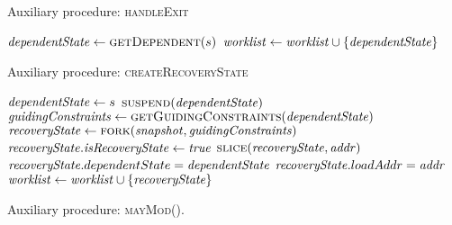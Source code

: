 \begin{algorithm}
  \caption{Auxiliary procedure: \textsc{handleExit}
  \label{fig:aux-func-recS}}
\begin{algorithmic}[1]

 \label{alg:exit-check-recovery}
  \State {} \label{alg:exit-terminate-recovery}
  \State $\dependentState \gets  \Call{getDependent}{\workstate}$ \label{alg:exit-extract-dependent}
  \State {} \label{alg:exit-resume}
  \State $\mathit{worklist} \gets  \mathit{worklist} \cup \{\mathit{dependentState}\}$
\Else
  \State {}  \label{alg:exit-normal}
  \label{alg:push-worklist-exit}
\EndIf
\EndFunction
\end{algorithmic}
\end{algorithm}

\begin{algorithm}
  \caption{Auxiliary procedure: \textsc{createRecoveryState}
  \label{fig:aux-func-recS}}
\begin{algorithmic}[1]

   \label{alg:recover-foreach}
     \label{alg:recover-if-found}
       \State $\mathit{dependentState} \gets s$ \label{alg:recover-gen-depS}
       \State $\Call{suspend}{\dependentState}$ \label{alg:recover-suspend}
       \State $\gc \gets  \Call{getGuidingConstraints}{\dependentState}$ \label{alg:recover-get-gc}
       \State $\recoveryState \gets \Call{fork}{\snapshot,\gc}$ \label{alg:recover-gen-recS}
       \State $\mathit{recoveryState}.\mathit{isRecoveryState} \gets \mathit{true}$ \label{alg:recover-set-is-recS}
       \State $\Call{slice}{\recoveryState,\addr}$ \label{alg:recover-slice}
       \State $\mathit{recoveryState}.dependentState = \mathit{dependentState}$ \label{alg:set-dependent-state}
       \State $\mathit{recoveryState}.loadAddr = \mathit{addr}$ \label{alg:set-load-addr}
       \State $\mathit{worklist} \gets \mathit{worklist} \cup \{\mathit{recoveryState}\}$
       \label{alg:push-worklist-recovery}
    \EndIf
  \EndFor
\EndFunction
\end{algorithmic}
\end{algorithm}

\begin{algorithm}
  \caption{Auxiliary procedure: \textsc{mayMod}().
  \label{fig:aux-func-may-mod}}
\begin{algorithmic}[1]


     \label{alg:maymod-static}
      \If{$\addr\not\in\owset$}  \label{alg:maymod-dynamic}
         \State {}
       \EndIf
    \EndIf
  \EndFor
  \State {}
\EndFunction

\end{algorithmic}
\end{algorithm}


